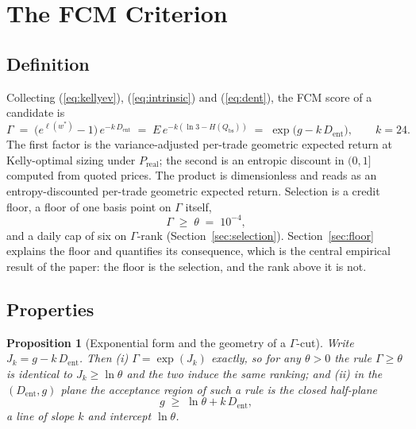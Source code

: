 \documentclass[11pt]{article}
\newtheorem{proposition}{Proposition}
\newcommand{\dent}{D_{\mathrm{ent}}}
\newcommand{\Preal}{P_{\mathrm{real}}}
\newcommand{\Qbs}{Q_{\mathrm{bs}}}
\begin{document}
\section{The FCM Criterion}
\label{sec:criterion}

\subsection{Definition}

Collecting (\ref{eq:kellyev}), (\ref{eq:intrinsic}) and (\ref{eq:dent}), the
FCM score of a candidate is
\begin{equation}
\Gamma \;=\; \bigl(e^{\ell(w^\ast)} - 1\bigr)\, e^{-k\,\dent}
\;=\; E \, e^{-k(\ln 3 - H(\Qbs))}
\;=\; \exp\bigl(g - k\,\dent\bigr),
\qquad k = 24 .
\label{eq:fcm}
\end{equation}
The first factor is the variance-adjusted per-trade geometric expected return
at Kelly-optimal sizing under $\Preal$; the second is an entropic discount in
$(0, 1]$ computed from quoted prices. The product is dimensionless and reads
as an entropy-discounted per-trade geometric expected return. Selection is a
credit floor, a floor of one basis point on $\Gamma$ itself,
\begin{equation}
\Gamma \;\geq\; \theta \;=\; 10^{-4},
\label{eq:floor-gamma}
\end{equation}
and a daily cap of six on $\Gamma$-rank (Section~\ref{sec:selection}).
Section~\ref{sec:floor} explains the floor and quantifies its consequence,
which is the central empirical result of the paper: the floor is the
selection, and the rank above it is not.

\subsection{Properties}

\begin{proposition}[Exponential form and the geometry of a $\Gamma$-cut]
\label{prop:halfplane}
Write $J_k = g - k\,\dent$. Then (i) $\Gamma = \exp(J_k)$ exactly, so for any
$\theta > 0$ the rule $\Gamma \geq \theta$ is identical to
$J_k \geq \ln\theta$ and the two induce the same ranking; and (ii) in the
$(\dent, g)$ plane the acceptance region of such a rule is the closed
half-plane
\begin{equation}
g \;\geq\; \ln\theta + k\,\dent ,
\label{eq:halfplane}
\end{equation}
a line of slope $k$ and intercept $\ln\theta$.
\end{proposition}
\end{document}
